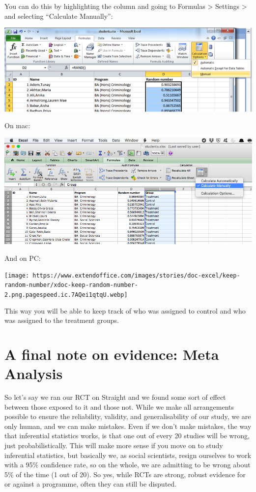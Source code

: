 \documentclass[]{book}
\theoremstyle{definition}
\theoremstyle{definition}
\theoremstyle{definition}
\theoremstyle{remark}
\begin{document}
You can do this by highlighting the column and going to Formulas
\textgreater{} Settings \textgreater{} and selecting ``Calculate
Manually'':

\includegraphics{imgs/calc_man_pc.png}

On mac:

\includegraphics{imgs/calc_man.png}

And on PC:

\texttt{[image: https://www.extendoffice.com/images/stories/doc-excel/keep-random-number/xdoc-keep-random-number-2.png.pagespeed.ic.7AQei1qtqU.webp]}

This way you will be able to keep track of who was assigned to control
and who was assigned to the treatment groups.

\hypertarget{a-final-note-on-evidence-meta-analysis}{%
\section{A final note on evidence: Meta
Analysis}\label{a-final-note-on-evidence-meta-analysis}}

So let's say we ran our RCT on Straight and we found some sort of effect
between those exposed to it and those not. While we make all
arrangements possible to ensure the reliability, validity, and
generalisability of our study, we are only human, and we can make
mistakes. Even if we don't make mistakes, the way that inferential
statistics works, is that one out of every 20 studies will be wrong,
just probabilistically. This will make more sense if you move on to
study inferential statistics, but basically we, as social scientists,
resign ourselves to work with a 95\% confidence rate, so on the whole,
we are admitting to be wrong about 5\% of the time (1 out of 20). So
yes, while RCTs are strong, robust evidence for or against a programme,
often they can still be disputed.
\end{document}
